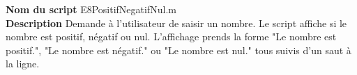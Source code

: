 \textbf{Nom du script}
E8PositifNegatifNul.m\\
\textbf{Description}
Demande à l'utilisateur de saisir un nombre. Le script affiche si le nombre est positif, négatif ou nul. L'affichage prends la forme "Le nombre est positif.", "Le nombre est négatif." ou "Le nombre est nul." tous suivis d'un saut à la ligne.